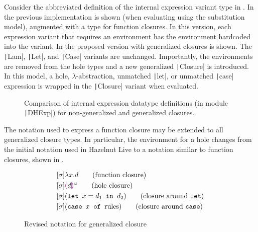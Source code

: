 Consider the abbreviated definition of the internal expression variant type in . In  the previous implementation is shown (when evaluating using the substitution model), augmented with a type for function closures. In this version, each expression variant that requires an environment has the environment hardcoded into the variant. In  the proposed version with generalized closures is shown. The \texttt|Lam|, \texttt|Let|, and \texttt|Case| variants are unchanged. Importantly, the environments are removed from the hole types and a new generalized \texttt|Closure| is introduced. In this model, a hole, $\lambda$-abstraction, unmatched \texttt|let|, or unmatched \texttt|case| expression is wrapped in the \texttt|Closure| variant when evaluated.

\begin{figure}
  \centering
  \begin{singlespace}
  \end{singlespace}
  \caption{Comparison of internal expression datatype definitions (in module \texttt|DHExp|) for non-generalized and generalized closures.}
  \label{fig:generalized-closures-datatypes}
\end{figure}

The notation used to express a function closure may be extended to all generalized closure types. In particular, the environment for a hole changes from the initial notation used in Hazelnut Live to a notation similar to function closures, shown in .

\begin{figure}
  \centering
  \begin{singlespace}
    \begin{align}
      \label{eq:generalized-closure-notation}
      &[\env]\lambda x.d\tag{function closure} \\
      &[\env]\hhole{d}^u\tag{hole closure} \\
      &[\env](\texttt{let }x=d_1\texttt{ in }d_2)\tag{closure around \texttt{let}} \\
      &[\env](\texttt{case }x\texttt{ of }\text{rules})\tag{closure around \texttt{case}}
    \end{align}
  \end{singlespace}
  \caption{Revised notation for generalized closure}
  \label{fig:generalized-closure-notation}
\end{figure}

